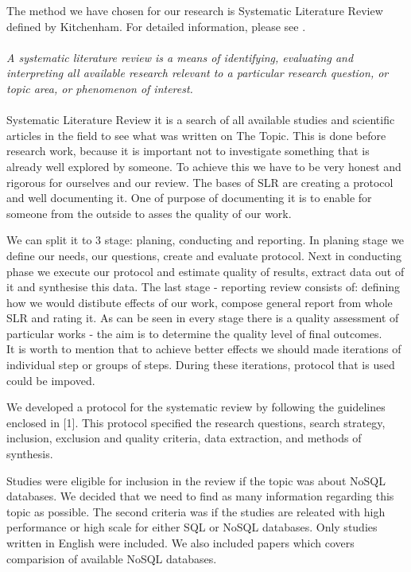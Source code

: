 \documentclass[times, 10pt,twocolumn]{article}
\begin{document}

The method we have chosen for our research is Systematic Literature Review defined by Kitchenham. For detailed information, please see \cite{kitchenham}. 
~\\
~\\
\emph {A systematic literature review is a means of identifying, evaluating and interpreting all available research relevant to a particular 
research question, or topic area, or phenomenon of interest.} \cite[p.~3]{kitchenham}
~\\
~\\
Systematic Literature Review it is a search of all available studies and scientific articles in the field to see what was written on The Topic. 
This is done before research work, because it is important not to investigate something that is already well explored by someone. To achieve this 
we have to be very honest and rigorous for ourselves and our review. The bases of SLR are creating a protocol and well documenting it. One of 
purpose of documenting it is to enable for someone from the outside to asses the quality of our work. 

We can split it to 3 stage: planing, conducting and reporting. In planing stage we define our needs, our questions, create and evaluate 
protocol. Next in conducting phase we execute our protocol and estimate quality of results, extract data out of it and synthesise this 
data. The last stage - reporting review consists of: defining how we would distibute effects of our work, compose general report from whole 
SLR and rating it. As can be seen in every stage there is a quality assessment of particular works - the aim is to determine the quality level of final outcomes.
~\\
It is worth to mention that to achieve better effects we should made iterations of individual step or groups of steps. During these iterations, protocol that is used could be impoved.


We developed a protocol for the systematic review by following the guidelines enclosed in [1]. This protocol specified the research questions, search
strategy, inclusion, exclusion and quality criteria, data extraction, and methods of synthesis.


Studies were eligible for inclusion in the review if the topic was about NoSQL databases. We decided that we need to find as many information regarding this topic as possible.
The second criteria was if the studies are releated with high performance or high scale for either SQL or NoSQL databases. Only studies written in English were included.
We also included papers which covers comparision of available NoSQL databases.
\end{document}
